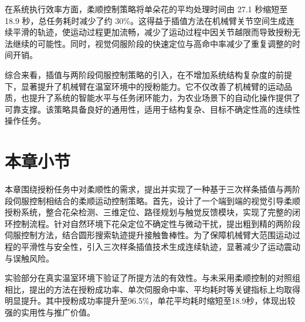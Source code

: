 在系统执行效率方面，柔顺控制策略将单朵花的平均处理时间由 27.1 秒缩短至 18.9 秒，总任务耗时减少了约 30\%。这得益于插值方法在机械臂关节空间生成连续平滑的轨迹，使运动过程更加流畅，减少了运动过程中因关节越限而导致授粉无法继续的可能性。同时，视觉伺服阶段的快速定位与高命中率减少了重复调整的时间开销。

综合来看，插值与两阶段伺服控制策略的引入，在不增加系统结构复杂度的前提下，显著提升了机械臂在温室环境中的授粉能力。它不仅改善了机械臂的运动品质，也提升了系统的智能水平与任务闭环能力，为农业场景下的自动化操作提供了可靠支撑。该策略具备良好的通用性，适用于结构复杂、目标不确定性高的连续性操作任务。

\section{本章小节}
本章围绕授粉任务中对柔顺性的需求，提出并实现了一种基于三次样条插值与两阶段伺服控制相结合的柔顺运动控制策略。首先，设计了一个端到端的视觉引导柔顺授粉系统，整合花朵检测、三维定位、路径规划与触觉反馈模块，实现了完整的闭环控制流程。针对自然环境下花朵定位不确定性与微动干扰，提出粗到精的两阶段伺服控制方法，结合圆形搜索轨迹提升接触鲁棒性。为了保障机械臂大范围运动过程的平滑性与安全性，引入三次样条插值技术生成连续轨迹，显著减少了运动震动与误触风险。

实验部分在真实温室环境下验证了所提方法的有效性。与未采用柔顺控制的对照组相比，提出的方法在授粉成功率、单次伺服命中率、平均耗时等关键指标上均取得明显提升。其中授粉成功率提升至96.5\%，单花平均耗时缩短至18.9秒，体现出较强的实用性与推广价值。

